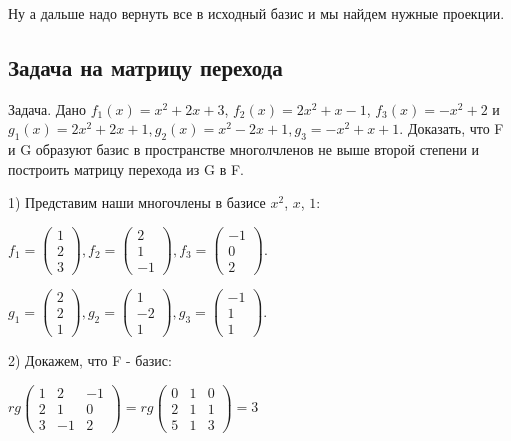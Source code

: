 \documentclass{article}
\begin{document}
Ну а дальше надо вернуть все в исходный базис и мы найдем нужные проекции.
\pagebreak
\subsection{Задача на матрицу перехода}
Задача. Дано $f_1(x) = x^2 + 2x + 3$, $f_2(x) = 2x^2+ x-1$, $f_3(x)=-x^2+2$ и $g_1(x) = 2x^2+2x+1, g_2(x) = x^2-2x+1, g_3 = -x^2 +x+1$. Доказать, что F и G образуют базис  в пространстве многолчленов не выше второй степени и построить матрицу перехода из G в F.

1) Представим наши многочлены в базисе $x^2$, $x$, $1$: 

$f_1 = \begin{pmatrix}
    1\\
    2\\
    3
\end{pmatrix}, f_2 = \begin{pmatrix}
    2\\
    1 \\
    -1
\end{pmatrix}, f_3 = \begin{pmatrix}
    -1\\
    0 \\
    2
\end{pmatrix}$.

$g_1 = \begin{pmatrix}
    2\\
    2\\
    1
\end{pmatrix}, g_2 = \begin{pmatrix}
    1\\
    -2 \\
    1
\end{pmatrix}, g_3 = \begin{pmatrix}
    -1\\
    1 \\
    1
\end{pmatrix}$.

2) Докажем, что F - базис:

$rg \begin{pmatrix}
    1 & 2 & -1 \\
    2 & 1 & 0 \\
    3 & -1 & 2
\end{pmatrix} = rg \begin{pmatrix}
    0 & 1 & 0 \\
    2 & 1 & 1 \\
    5 & 1 & 3
\end{pmatrix} = 3 $
\end{document}
